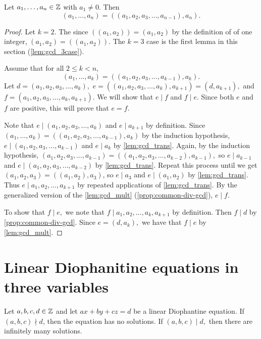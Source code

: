 \documentclass{ximera}
\begin{document}
\begin{proposition}
 	Let $a_1,\dots,a_n\in\mathbb Z$ with $a_1\neq 0$.  Then 
		\[
			(a_1,\dots,a_n)
			=((a_1,a_2,a_3,\dots,a_{n-1}),a_n).
		\]
	\begin{proof}
 		Let $k=2$. The since $((a_1,a_2))=(a_1,a_2)$ by the definition of  of one integer,  $(a_1,a_2)=((a_1,a_2))$. The $k=3$ case is the first lemma in this section (\ref{lem:gcd_3case}).
 
 		Assume that for all $2\leq k< n$, 
 			\[
				(a_1,\dots,a_k)
				=((a_1,a_2,a_3,\dots,a_{k-1}),a_k).
			\]
		Let $d=(a_1,a_2,a_3,\dots,a_{k}),$
		$e=((a_1,a_2,a_3,\dots,a_{k}),a_{k+1})=(d,a_{k+1}),$ and $f= (a_1,a_2,a_3,\dots,a_{k},a_{k+1}).$ We will show that $e\mid f$ and $f\mid e$. Since both $e$ and $f$ are positive, this will prove that $e=f$.

		Note that $e\mid (a_1,a_2,a_3,\dots,a_{k})$ and $e\mid a_{k+1}$ by definition. 
		Since $(a_1,\dots,a_k)=((a_1,a_2,a_3,\dots,a_{k-1}),a_k)$ by the induction hypothesis, $e\mid(a_1,a_2,a_3,\dots,a_{k-1})$ and $e\mid a_k$ by \cref{lem:gcd_trans}. Again, by the induction hypothesis, $(a_1,a_2,a_3,\dots,a_{k-1})=((a_1,a_2,a_3,\dots,a_{k-2}),a_{k-1}),$ so $e\mid a_{k-1}$ and $e\mid (a_1,a_2,a_3,\dots,a_{k-2})$ by \cref{lem:gcd_trans}. Repeat this process until we get $(a_1,a_2,a_3)=((a_1,a_2),a_3)$, so $e\mid a_3$ and $e\mid (a_1,a_2)$ by \cref{lem:gcd_trans}. Thus $e\mid a_1,a_2,\dots,a_{k+1}$ by repeated applications of \cref{lem:gcd_trans}. By the generalized version of the \cref{lem:gcd_mult} (\cref{prop:common-div-gcd}), $e\mid f.$

		To show that $f\mid e,$ we note that $f\mid a_1,a_2,\dots, a_k,a_{k+1}$ by definition. Then $f\mid d$ by \cref{prop:common-div-gcd}. Since $e=(d,a_k),$ we have that $f\mid e$ by \cref{lem:gcd_mult}.
	\end{proof}
\end{proposition}


\section{Linear Diophanitine equations in three variables}

\begin{proposition}\label{prop:3diophantine}
    Let $a,b,c,d\in\mathbb Z$ and let $ax+by+cz=d$ be a linear Diophantine equation. If $(a,b,c)\nmid d$, then the equation has no solutions. If $(a,b,c)\mid d,$ then there are infinitely many solutions.
\end{proposition}
\end{document}
